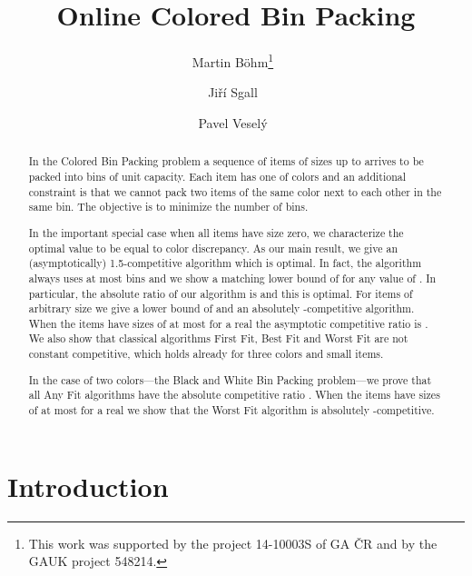 \documentclass[11pt,a4paper]{article}
\newcommand*\samethanks[1][\value{footnote}]{\footnotemark[#1]}
\begin{document}
\date{}
\title{Online Colored Bin Packing}
\author[1]{Martin B\"{o}hm\thanks{This work was supported by the
project 14-10003S of GA \v{C}R and by the GAUK project 548214.}\ }
\author[1]{Ji\v{r}\'{i} Sgall\samethanks\ }
\author[1]{Pavel Vesel\'{y}\samethanks\ }


\newtheorem*{define}{Definition}
\newtheorem{theorem}{Theorem}[section]
\newtheorem{lemma}[theorem]{Lemma}
\newtheorem{claim}[theorem]{Claim}
\newtheorem{observation}[theorem]{Observation}
\newtheorem{corollary}[theorem]{Corollary}
\newtheorem{proposition}[theorem]{Proposition}

\maketitle

\begin{abstract}
In the Colored Bin Packing problem a sequence of items of sizes up to
 arrives to be packed into bins of unit capacity. Each item has one
of  colors and an additional constraint is that we cannot
pack two items of the same color next to each other in the same bin.
The objective is to minimize the number of bins.

In the important special case when all items have size zero, we
characterize the optimal value to be equal to color discrepancy. As
our main result, we give an (asymptotically) 1.5-competitive algorithm
which is optimal. In fact, the algorithm always uses at most
 bins and we show a matching lower
bound of  for any value of
.
In particular, the absolute ratio of our algorithm
is  and this is optimal.
For items of arbitrary size we give a lower bound of 
and an absolutely -competitive
algorithm.
When the items have sizes of at most  for a real  the asymptotic competitive ratio is .
We also show that classical algorithms First Fit, Best Fit and Worst Fit are not
constant competitive, which holds already for three colors and small items.

In the case of two colors---the Black and White Bin Packing
problem---we prove that all Any Fit algorithms have the absolute
competitive ratio . When the items have sizes of at most  for a
real  we show that the Worst Fit algorithm is absolutely
-competitive.
\end{abstract}

\section{Introduction}
\end{document}
